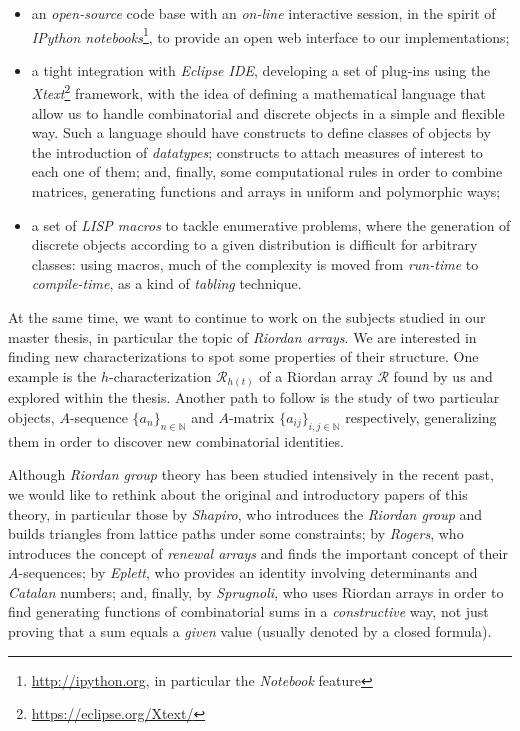 \begin{itemize} 

    \item an \emph{open-source} code base with an \emph{on-line} interactive
    session, in the spirit of \emph{IPython
    notebooks}\footnote{\url{http://ipython.org}, in particular the
    \emph{Notebook} feature}, to provide an open web interface to our
    implementations; 

    \item a tight integration with \emph{Eclipse IDE}, developing a set of
    plug-ins using the \emph{Xtext}\footnote{\url{https://eclipse.org/Xtext/}}
    framework, with the idea of defining a mathematical language that allow us to
    handle combinatorial and discrete objects in a simple and flexible way. Such
    a language should have constructs to define classes of objects by the
    introduction of \emph{datatypes}; constructs to attach measures of interest
    to each one of them; and, finally, some computational rules in order to
    combine matrices, generating functions and arrays in uniform and
    polymorphic ways; 

    \item a set of \emph{LISP macros} to tackle enumerative problems, where the
    generation of discrete objects according to a given distribution is
    difficult for arbitrary classes: using macros, much of the complexity is
    moved from \emph{run-time} to \emph{compile-time}, as a kind of
    \emph{tabling} technique.

\end{itemize}

At the same time, we want to continue to work on the subjects studied in our
master thesis, in particular the topic of \emph{Riordan arrays}. We are
interested in finding new characterizations to spot some properties of their
structure. One example is the $h$-characterization $\mathcal{R}_{h(t)}$ of a
Riordan array $\mathcal{R}$ found by us and explored within the thesis.
Another path to follow is the study of two particular objects, $A$-sequence
$\lbrace a_{n}\rbrace_{n\in\mathbb{N}}$ and $A$-matrix $\lbrace
a_{ij}\rbrace_{i,j\in\mathbb{N}}$ respectively, generalizing them in order to
discover new combinatorial identities.%

Although \emph{Riordan group} theory has been studied intensively in the recent past, we would
like to rethink about the original and introductory papers of this theory, in
particular those by \emph{Shapiro}, who introduces the \emph{Riordan group} and
builds triangles from lattice paths under some constraints; by \emph{Rogers},
who introduces the concept of \emph{renewal arrays} and finds the important
concept of their $A$-sequences; by \emph{Eplett}, who provides an identity
involving determinants and \emph{Catalan} numbers; and, finally, by
\emph{Sprugnoli}, who uses Riordan arrays in order to find generating
functions of combinatorial sums in a \emph{constructive} way, not just proving
that a sum equals a \emph{given} value (usually denoted by a closed formula). 

